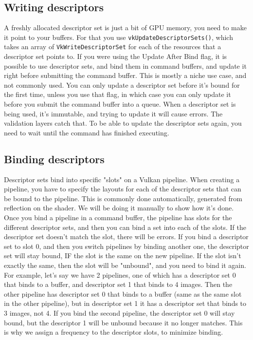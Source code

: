 \documentclass[12pt]{article}
\begin{document}
	\subsection{Writing descriptors}
	A freshly allocated descriptor set is just a bit of GPU memory, you need to make it point to your buffers. For that you use \texttt{vkUpdateDescriptorSets()}, which takes an array of \texttt{VkWriteDescriptorSet} for each of the resources that a descriptor set points to. If you were using the Update After Bind flag, it is possible to use descriptor sets, and bind them in command buffers, and update it right before submitting the command buffer. This is mostly a niche use case, and not commonly used. You can only update a descriptor set before it's bound for the first time, unless you use that flag, in which case you can only update it before you submit the command buffer into a queue. When a descriptor set is being used, it's immutable, and trying to update it will cause errors. The validation layers catch that. To be able to update the descriptor sets again, you need to wait until the command has finished executing.

	\subsection{Binding descriptors}
	Descriptor sets bind into specific "slots" on a Vulkan pipeline. When creating a pipeline, you have to specify the layouts for each of the descriptor sets that can be bound to the pipeline. This is commonly done automatically, generated from reflection on the shader. We will be doing it manually to show how it's done. Once you bind a pipeline in a command buffer, the pipeline has slots for the different descriptor sets, and then you can bind a set into each of the slots. If the descriptor set doesn't match the slot, there will be errors. If you bind a descriptor set to slot 0, and then you switch pipelines by binding another one, the descriptor set will stay bound, IF the slot is the same on the new pipeline. If the slot isn't exactly the same, then the slot will be "unbound", and you need to bind it again. For example, let's say we have 2 pipelines, one of which has a descriptor set 0 that binds to a buffer, and descriptor set 1 that binds to 4 images. Then the other pipeline has descriptor set 0 that binds to a buffer (same as the same slot in the other pipeline), but in descriptor set 1 it has a descriptor set that binds to 3 images, not 4. If you bind the second pipeline, the descriptor set 0 will stay bound, but the descriptor 1 will be unbound because it no longer matches. This is why we assign a frequency to the descriptor slots, to minimize binding.
\end{document}
